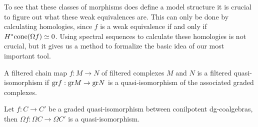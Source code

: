 \documentclass[../thesis.tex]{subfiles}
\begin{document}


            To see that these classes of morphisms does define a model structure it is crucial to figure out what these weak equivalences are. This can only be done by calculating homologies, since $f$ is a weak equivalence if and only if $H^*\tt{cone}(\Omega f) \simeq 0$. Using spectral sequences to calculate these homologies is not crucial, but it gives us a method to formalize the basic idea of our most important tool.

            \begin{definition}
                A filtered chain map $f : M \rightarrow N$ of filtered complexes $M$ and $N$ is a filtered quasi-isomorphism if $\tt{gr}f : \tt{gr}M \rightarrow \tt{gr}N$ is a quasi-isomorphism of the associated graded complexes.
            \end{definition}

            \begin{lemma}\label{lem: graded-qif-are-w}
                Let $f : C\rightarrow C'$ be a graded quasi-isomorphism between conilpotent dg-coalgebras, then $\Omega f : \Omega C \rightarrow \Omega C'$ is a quasi-isomorphism. 
            \end{lemma}
\end{document}
